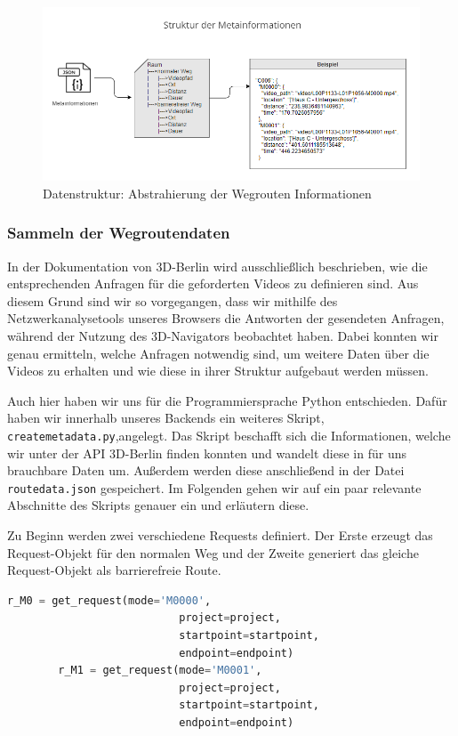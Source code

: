 \begin{figure}[H]
    \includegraphics[width=\textwidth]{Figures/3DNavigator/Metadatenstruktur_Raumfinder.png}
    \caption{Datenstruktur: Abstrahierung der Wegrouten Informationen}
    \label{fig:json-bild}
    \centering
\end{figure}

\subsubsection{Sammeln der Wegroutendaten}
\label{sec:jsonget}
In der Dokumentation von 3D-Berlin wird ausschließlich beschrieben, wie die entsprechenden Anfragen für die geforderten Videos zu definieren sind. Aus diesem Grund sind wir so vorgegangen, dass wir mithilfe des Netzwerkanalysetools unseres Browsers die Antworten der gesendeten Anfragen, während der Nutzung des 3D-Navigators beobachtet haben. Dabei konnten wir genau ermitteln, welche Anfragen notwendig sind, um weitere Daten über die Videos zu erhalten und wie diese in ihrer Struktur aufgebaut werden müssen.

Auch hier haben wir uns für die Programmiersprache Python entschieden. Dafür haben wir innerhalb unseres Backends ein weiteres Skript, \verb|createmetadata.py|,angelegt. Das Skript beschafft sich die Informationen, welche wir unter der API 3D-Berlin finden konnten und wandelt diese in für uns brauchbare Daten um. Außerdem werden diese anschließend in der Datei \verb|routedata.json| gespeichert. Im Folgenden gehen wir auf ein paar relevante Abschnitte des Skripts genauer ein und erläutern diese.

Zu Beginn werden zwei verschiedene Requests definiert. Der Erste erzeugt das Request-Objekt für den normalen Weg und der Zweite generiert das gleiche Request-Objekt als barrierefreie Route.

\begin{lstlisting}[language=Python, caption={definieren der Anfragen}]
        r_M0 = get_request(mode='M0000',
                           project=project,
                           startpoint=startpoint,
                           endpoint=endpoint)
        r_M1 = get_request(mode='M0001', 
                           project=project, 
                           startpoint=startpoint, 
                           endpoint=endpoint)

\end{lstlisting}

